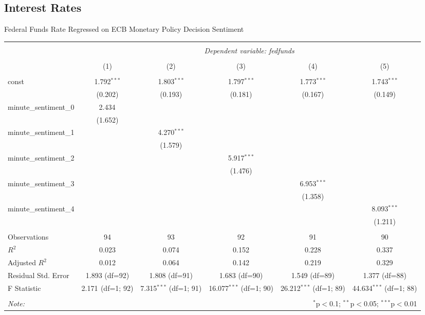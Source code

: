 \documentclass{article}
\begin{document}
\subsection{Interest Rates}

Federal Funds Rate Regressed on ECB Monetary Policy Decision Sentiment

\begin{table}[H] 
\begin{adjustbox}{width=\textwidth}
\centering
\begin{tabular}{@{\extracolsep{5pt}}lccccc}
\\[-1.8ex]\hline
\hline \\[-1.8ex]
& \multicolumn{5}{c}{\textit{Dependent variable: fedfunds}} \\
\cline{2-6}
\\[-1.8ex] & (1) & (2) & (3) & (4) & (5) \\
\hline \\[-1.8ex]
const & 1.792$^{***}$ & 1.803$^{***}$ & 1.797$^{***}$ & 1.773$^{***}$ & 1.743$^{***}$ \\
& (0.202) & (0.193) & (0.181) & (0.167) & (0.149) \\
minute\_sentiment\_0 & 2.434$^{}$ & & & & \\
& (1.652) & & & & \\
minute\_sentiment\_1 & & 4.270$^{***}$ & & & \\
& & (1.579) & & & \\
minute\_sentiment\_2 & & & 5.917$^{***}$ & & \\
& & & (1.476) & & \\
minute\_sentiment\_3 & & & & 6.953$^{***}$ & \\
& & & & (1.358) & \\
minute\_sentiment\_4 & & & & & 8.093$^{***}$ \\
& & & & & (1.211) \\
\hline \\[-1.8ex]
Observations & 94 & 93 & 92 & 91 & 90 \\
$R^2$ & 0.023 & 0.074 & 0.152 & 0.228 & 0.337 \\
Adjusted $R^2$ & 0.012 & 0.064 & 0.142 & 0.219 & 0.329 \\
Residual Std. Error & 1.893 (df=92) & 1.808 (df=91) & 1.683 (df=90) & 1.549 (df=89) & 1.377 (df=88) \\
F Statistic & 2.171$^{}$ (df=1; 92) & 7.315$^{***}$ (df=1; 91) & 16.077$^{***}$ (df=1; 90) & 26.212$^{***}$ (df=1; 89) & 44.634$^{***}$ (df=1; 88) \\
\hline
\hline \\[-1.8ex]
\textit{Note:} & \multicolumn{5}{r}{$^{*}$p$<$0.1; $^{**}$p$<$0.05; $^{***}$p$<$0.01} \\
\end{tabular}
\end{adjustbox}
\end{table}
\end{document}
